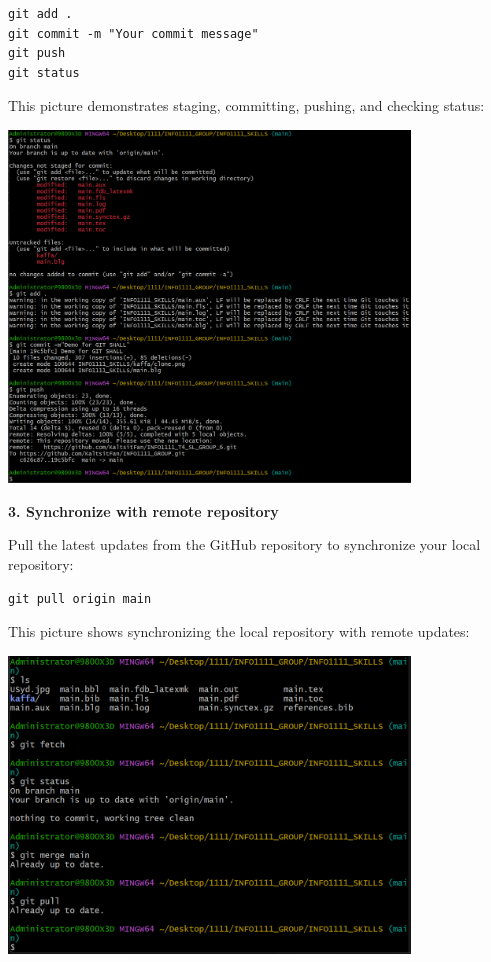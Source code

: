 \documentclass[a4paper, 11pt]{report}
\begin{document}
\begin{verbatim}
git add .
git commit -m "Your commit message"
git push
git status
\end{verbatim}

This picture demonstrates staging, committing, pushing, and checking status:

\begin{center}
\includegraphics[width=0.8\textwidth]{kaffa/push.png}
\end{center}

\textbf{3. Synchronize with remote repository}

Pull the latest updates from the GitHub repository to synchronize your local repository:

\begin{verbatim}
git pull origin main
\end{verbatim}

This picture shows synchronizing the local repository with remote updates:

\begin{center}
\includegraphics[width=0.8\textwidth]{kaffa/synchronize.png}
\end{center}
\end{document}
